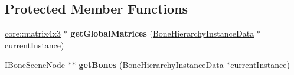\subsection*{Protected Member Functions}
\begin{DoxyCompactItemize}
\item 
\hyperlink{classirr_1_1core_1_1matrix4x3}{core\+::matrix4x3} $\ast$ {\bfseries get\+Global\+Matrices} (\hyperlink{classirr_1_1scene_1_1ISkinningStateManager_1_1BoneHierarchyInstanceData}{Bone\+Hierarchy\+Instance\+Data} $\ast$current\+Instance)\hypertarget{classirr_1_1scene_1_1ISkinningStateManager_a7a425d2de5412d26a3afc63b52228e7b}{}\label{classirr_1_1scene_1_1ISkinningStateManager_a7a425d2de5412d26a3afc63b52228e7b}

\item 
\hyperlink{classirr_1_1scene_1_1ISkinningStateManager_1_1IBoneSceneNode}{I\+Bone\+Scene\+Node} $\ast$$\ast$ {\bfseries get\+Bones} (\hyperlink{classirr_1_1scene_1_1ISkinningStateManager_1_1BoneHierarchyInstanceData}{Bone\+Hierarchy\+Instance\+Data} $\ast$current\+Instance)\hypertarget{classirr_1_1scene_1_1ISkinningStateManager_a9a314b9abe17d9a68294db97e00dbe4e}{}\label{classirr_1_1scene_1_1ISkinningStateManager_a9a314b9abe17d9a68294db97e00dbe4e}

\end{DoxyCompactItemize}
